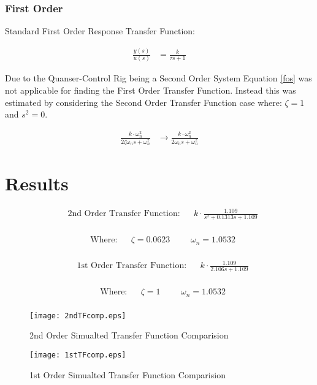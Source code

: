 \subsubsection{First Order}\label{first-order}

Standard First Order Response Transfer Function:

\begin{align}
 \frac { y(s) }{ u(s) } &=\frac { k }{ \tau s+1 }
\label{fos}
\end{align}

Due to the Quanser-Control Rig being a Second Order System Equation
\ref{fos} was not applicable for finding the First Order Transfer
Function. Instead this was estimated by considering the Second Order
Transfer Function case where: \(\zeta =1\) and \(s^2=0\).

\begin{align}
\frac { k\cdot \omega_{ n }^{ 2 } }{ 2\zeta \omega_{ n }s+\omega_{ n }^{ 2 } } &\rightarrow \frac { k\cdot \omega_{ n }^{ 2 } }{ 2\omega_{ n }s+\omega_{ n }^{ 2 } }
\end{align}

\section{Results}\label{results}

\begin{align}
&\text{2nd Order Transfer Function}: && k \cdot \frac { 1.109 }{ s^{ 2 }+0.1313s+1.109 }
\end{align}

\begin{align*}
\\
&\text{Where:} &&\zeta = 0.0623 &&& \omega_n = 1.0532
\\
\end{align*}

\begin{align}
&\text{1st Order Transfer Function}: && k \cdot \frac { 1.109 }{ 2.106s+1.109 }
\end{align}

\begin{align*}
\\
&\text{Where:} &&\zeta = 1 &&& \omega_n = 1.0532
\\
\end{align*}

\begin{figure}[H]
\centering
\begin{minipage}{.49\textwidth}
\centering
\texttt{[image: 2ndTFcomp.eps]}
\caption{2nd Order Simualted Transfer Function Comparision}
\label{2ndTFcomp}
\end{minipage}
\hfill
\begin{minipage}{.49\textwidth}
  \centering
  \texttt{[image: 1stTFcomp.eps]}
  \caption{1st Order Simualted Transfer Function Comparision}
  \label{1stTFcomp}
\end{minipage}
\vspace{-11pt}
\end{figure}

